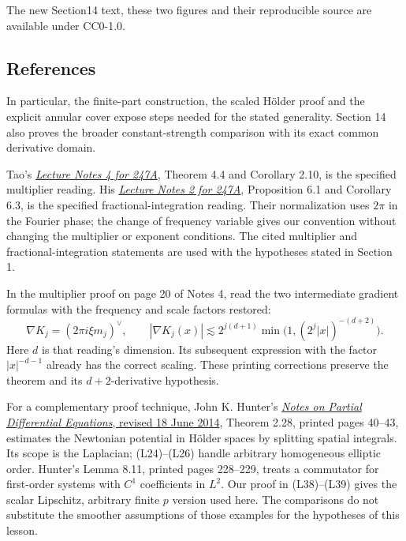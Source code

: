 \documentclass[
  11pt,
]{article}
\makeatletter
\let\ReaderOriginalAnchorStart\hyper@anchorstart
\let\ReaderOriginalAnchorEnd\hyper@anchorend
\let\ReaderPendingAliases\@empty
\def\ReaderArmAliases#1{\gdef\ReaderPendingAliases{#1}}
\def\hyper@anchorstart#1{\ReaderIfNativeAnchorTF{#1}{\ReaderPendingAliases\global\let\ReaderPendingAliases\@empty}{}\ReaderOriginalAnchorStart{#1}}
\makeatother
\begin{document}
The new Section14 text, these two figures and their reproducible source
are available under CC0-1.0.

\ReaderArmAliases{\ReaderOriginalAnchorStart{reading-routes-and-scope-of-the-imports}\ReaderOriginalAnchorEnd\begingroup\expandafter\def\csname @currentHref\endcsname{reading-routes-and-scope-of-the-imports}\label{reading-routes-and-scope-of-the-imports}\endgroup\ReaderOriginalAnchorStart{references}\ReaderOriginalAnchorEnd}
\subsection{References}\label{references}

In particular, the finite-part construction, the scaled Hölder proof and
the explicit annular cover expose steps needed for the stated
generality. Section 14 also proves the broader constant-strength
comparison with its exact common derivative domain.

Tao's
\href{https://www.math.ucla.edu/~tao/247a.1.06f/notes4.pdf}{\emph{Lecture
Notes 4 for 247A}}, Theorem 4.4 and Corollary 2.10, is the specified
multiplier reading. His
\href{https://www.math.ucla.edu/~tao/247a.1.06f/notes2.pdf}{\emph{Lecture
Notes 2 for 247A}}, Proposition 6.1 and Corollary 6.3, is the specified
fractional-integration reading. Their normalization uses \(2\pi\) in the
Fourier phase; the change of frequency variable gives our convention
without changing the multiplier or exponent conditions. The cited
multiplier and fractional-integration statements are used with the
hypotheses stated in Section 1.

In the multiplier proof on page 20 of Notes 4, read the two intermediate
gradient formulas with the frequency and scale factors restored: \[
\nabla K_j=(2\pi i\xi m_j)^\vee,\qquad
|\nabla K_j(x)|\lesssim 2^{j(d+1)}
       \min\bigl(1,(2^j|x|)^{-(d+2)}\bigr).
\] Here \(d\) is that reading's dimension. Its subsequent expression
with the factor \(|x|^{-d-1}\) already has the correct scaling. These
printing corrections preserve the theorem and its \(d+2\)-derivative
hypothesis.

For a complementary proof technique, John K. Hunter's
\href{https://www.math.ucdavis.edu/~hunter/pdes/pde_notes.pdf}{\emph{Notes
on Partial Differential Equations}, revised 18 June 2014}, Theorem 2.28,
printed pages 40--43, estimates the Newtonian potential in Hölder spaces
by splitting spatial integrals. Its scope is the Laplacian; (L24)--(L26)
handle arbitrary homogeneous elliptic order. Hunter's Lemma 8.11,
printed pages 228--229, treats a commutator for first-order systems with
\(C^1\) coefficients in \(L^2\). Our proof in (L38)--(L39) gives the
scalar Lipschitz, arbitrary finite \(p\) version used here. The
comparisons do not substitute the smoother assumptions of those examples
for the hypotheses of this lesson.
\end{document}

